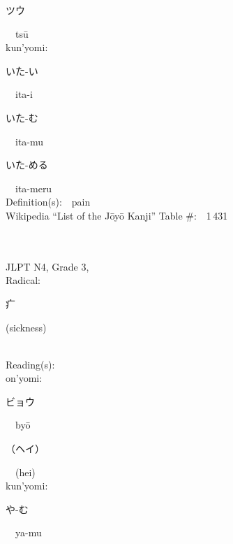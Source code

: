 \begin{multicols}{2}
{\hspace*{2em}}{\begin{CJK}{UTF8}{min} ツウ \end{CJK}}\ \ ts\=u\ \ \\
{\hspace*{1em}}kun'yomi:\ \ \\
{\hspace*{2em}}{\begin{CJK}{UTF8}{min} いた-い \end{CJK}}\ \ ita-i\ \ \\
{\hspace*{2em}}{\begin{CJK}{UTF8}{min} いた-む \end{CJK}}\ \ ita-mu\ \ \\
{\hspace*{2em}}{\begin{CJK}{UTF8}{min} いた-める \end{CJK}}\ \ ita-meru\ \ \\
Definition(s):\ \ pain \\
Wikipedia ``List of the J\=oy\=o Kanji'' Table \#:\ \ 1\,431 \\
\ \ \\
{\fontsize{34pt}{40pt}  }\ \ \\  %
{JLPT N4, Grade 3, \\Radical:\ \ {\begin{CJK}{UTF8}{min} 疒 \end{CJK}} (sickness) } \\
Reading(s):\ \ \\
{\hspace*{1em}}on'yomi:\ \ \\
{\hspace*{2em}}{\begin{CJK}{UTF8}{min} ビョウ \end{CJK}}\ \ by\=o\ \ \\
{\hspace*{2em}}{\begin{CJK}{UTF8}{min} （ヘイ） \end{CJK}}\ \ (hei)\ \ \\
{\hspace*{1em}}kun'yomi:\ \ \\
{\hspace*{2em}}{\begin{CJK}{UTF8}{min} や-む \end{CJK}}\ \ ya-mu\ \ \\

\end{multicols}
